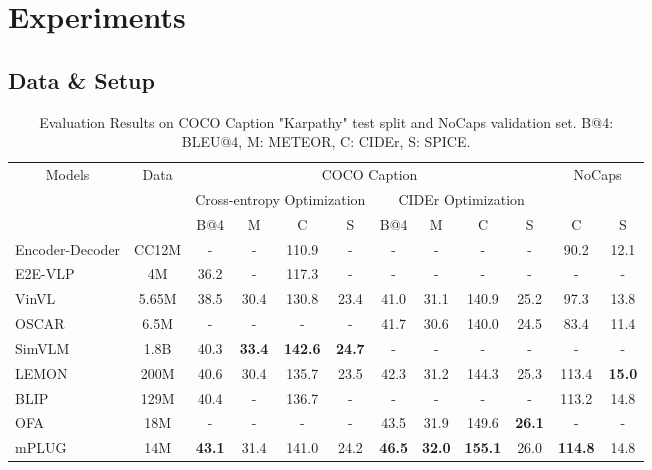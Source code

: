 \documentclass[11pt]{article}
\begin{document}
\section{Experiments} \subsection{Data \& Setup}

\begin{table*}
\setlength\tabcolsep{4pt}
\centering
\begin{tabular}{l|c|cccccccc|cc}
\toprule
\multicolumn{1}{c|}{\multirow{3}{*}{Models}}      &
\multicolumn{1}{c|}{\multirow{3}{*}{Data}} &
\multicolumn{8}{c|}{COCO Caption} & \multicolumn{2}{c}{\multirow{1}{*}{NoCaps}}  \\
\multicolumn{1}{c|}{\multirow{2}{*}{}}      &
\multicolumn{1}{c|}{} &
\multicolumn{4}{c}{Cross-entropy Optimization} & \multicolumn{4}{c|}{CIDEr Optimization} & \multicolumn{2}{c}{}  \\
      &  & B@4 & M & C & S & B@4 & M & C & S & C & S     \\
      
\midrule      
Encoder-Decoder & CC12M & - & - & 110.9 & - &  - & - & - & - & 90.2 & 12.1 \\
E2E-VLP \cite{xu2021e2e} &4M& 36.2 &-&117.3&-&  - & - & - & - & - & - \\
VinVL \cite{zhang2021vinvl} & 5.65M & 38.5 & 30.4 & 130.8 & 23.4 & 41.0 & 31.1 & 140.9 & 25.2 & 97.3 & 13.8 \\
OSCAR \cite{li2020oscar} & 6.5M & - & - & - & - & 41.7 & 30.6 & 140.0 & 24.5 & 83.4 & 11.4 \\
SimVLM \cite{wang2021simvlm} & 1.8B & 40.3 & \textbf{33.4} & \textbf{142.6} & \textbf{24.7} & - & - & - & - & - & - \\
LEMON \cite{LEMON} & 200M & 40.6 & 30.4 & 135.7 & 23.5 & 42.3 & 31.2 & 144.3 & 25.3 & 113.4 & \textbf{15.0} \\
BLIP \cite{li2022blip} & 129M & 40.4 & - & 136.7 & - & - & - & - & - & 113.2 & 14.8  \\
OFA \cite{wang2022OFA} & 18M & - & - & - & - & 43.5 & 31.9 & 149.6 & \textbf{26.1} & - & - \\
\midrule
mPLUG & 14M  & \textbf{43.1} & 31.4 & 141.0 & 24.2 & \textbf{46.5} & \textbf{32.0} & \textbf{155.1} & 26.0 & \textbf{114.8} & 14.8 \\
\midrule

\end{tabular}
\caption{Evaluation Results on COCO Caption "Karpathy" test split and NoCaps validation set. B@4: BLEU@4, M: METEOR, C: CIDEr, S: SPICE.} 
\label{table:caption}
\end{table*}
\end{document}
